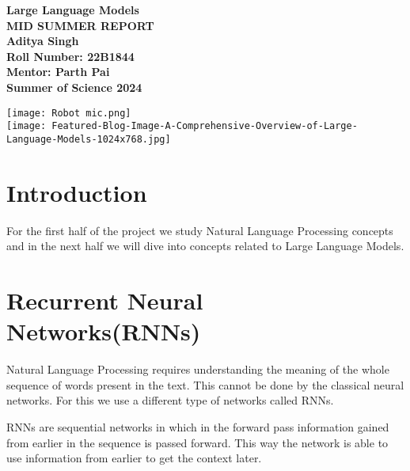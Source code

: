 \documentclass{article}
\begin{document}
\begin{titlepage}
\centering
\vspace{5cm}

\textbf{\Huge Large Language Models} \\
\vspace{0.5cm}
\textbf{\Large MID SUMMER REPORT} \\
\vspace{0.5cm}
\textbf{\Large Aditya Singh}\\
\vspace{0.5cm}
\textbf{\Large Roll Number: 22B1844}\\
\vspace{0.5cm}
\textbf{\Large Mentor: Parth Pai}\\
\vspace{0.5cm}
\textbf{\Large Summer of Science 2024} \\
\vspace{1cm}

\texttt{[image: Robot mic.png]} \\
\vspace{0.5cm}
\texttt{[image: Featured-Blog-Image-A-Comprehensive-Overview-of-Large-Language-Models-1024x768.jpg]}


\end{titlepage}

\clearpage

\tableofcontents

\newpage

\section{\Huge {Introduction}}

\vspace{0.4cm}
\flushleft
\Large
\justifying
For the first half of the project we study Natural Language Processing concepts and in the next half we will dive into concepts related to Large Language Models.

\section{\Huge Recurrent Neural Networks(RNNs)}
Natural Language Processing requires understanding the meaning of the whole sequence of words present in the text. This cannot be done by the classical neural networks. For this we use a different type of networks called RNNs.

\flushleft
RNNs are sequential networks in which in the forward pass information gained from earlier in the sequence is passed forward. This way the network is able to use information from earlier to get the context later.
\vspace{.5cm}
\end{document}
